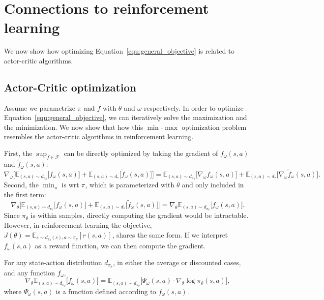 \section{Connections to reinforcement learning}
We now show how optimizing Equation~\ref{equ:general_objective} is related  to actor-critic algorithms.

\subsection{Actor-Critic optimization}
Assume we parametrize $\pi$ and $f$ with $\theta$ and $\omega$ respectively. 
In order to optimize Equation~\ref{equ:general_objective}, we can iteratively solve the maximization and the minimization. 
We now show that how this $\min$-$\max$ optimization problem resembles the actor-critic algorithms in reinforcement learning. 

First, the $\sup_{f\in\mathcal{F}}$ can be directly optimized by taking the gradient of $f_{\omega}(s, a)$ and $\tilde{f}_{\omega}(s, a)$: 
\begin{equation*}
\nabla_{\omega} \Big[ \mathbb{E}_{(s, a)\sim d_{\pi_{\theta}}} \big[ f_{\omega}(s, a) \big] + \mathbb{E}_{(s, a)\sim d_*} \big[ \tilde{f}_{\omega}(s, a) \big] \Big]
= \mathbb{E}_{(s, a)\sim d_{\pi_{\theta}}} \big[ \nabla_{\omega} f_{\omega}(s, a) \big] + \mathbb{E}_{(s, a)\sim d_*} \big[ \nabla_{\omega} \tilde{f}_{\omega}(s, a) \big].
\end{equation*}
Second, the $\min_{\pi}$ is wrt $\pi$, which is parameterized with $\theta$ and only included in the first term:
\begin{equation*}
\nabla_{\theta} \Big[ \mathbb{E}_{(s, a)\sim d_{\pi_{\theta}}} \big[ f_{\omega}(s, a) \big] + \mathbb{E}_{(s, a)\sim d_*} \big[ \tilde{f}_{\omega}(s, a) \big] \Big]
= \nabla_{\theta} \mathbb{E}_{(s, a)\sim d_{\pi_{\theta}}} \big[ f_{\omega}(s, a) \big]. 
\end{equation*}
Since $\pi_{\theta}$ is within samples,  directly computing the gradient would be intractable. However, in reinforcement learning the objective, $J(\theta)=\mathbb{E}_{s\sim d_{\pi_{\theta}}(s), a\sim\pi_{\theta}}[r(s, a)]$, shares the same form. If we interpret $f_{\omega}(s, a)$ as a reward function, we can then compute the gradient. 
\begin{theorem}\label{theo:policy_gradient}
For any state-action distribution $d_{\pi_{\theta}}$, in either the average or discounted cases, and any function $f_{\omega}$, 
\begin{equation*}
\nabla_\theta \mathbb{E}_{(s, a)\sim d_{\pi_{\theta}}}\big[ f_{\omega}(s, a) \big] = \mathbb{E}_{(s, a)\sim d_{\pi_{\theta}}} \big[ \Psi_{\omega}(s, a) \cdot \nabla_\theta \log \pi_{\theta}(s, a) \big], 
\end{equation*}
where $\Psi_{\omega}(s, a)$ is a function defined according to $f_{\omega}(s, a)$. 
\end{theorem}


